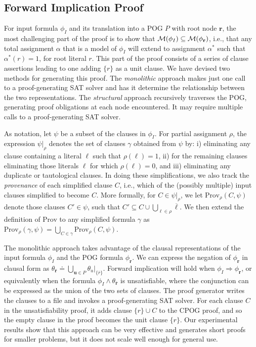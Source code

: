 \documentclass[twoside,11pt]{article}
\newcommand{\obar}[1]{\overline{#1}}
\newcommand{\lit}{\ell}
\newcommand{\imply}{\Rightarrow}
\newcommand{\extend}[1]{#1^{*}}
\newcommand{\assign}{\alpha}
\newcommand{\eassign}{\extend{\alpha}}
\newcommand{\passign}{\rho}
\newcommand{\modelset}{{\cal M}}
\newcommand{\prov}{\textrm{Prov}}
\newcommand{\inputformula}{\phi_I}
\newcommand{\makenode}[1]{\mathbf{#1}}
\newcommand{\nodeu}{\makenode{u}}
\newcommand{\noder}{\makenode{r}}
\newcommand{\simplify}[2]{#1|_{#2}}
\begin{document}
\subsection{Forward Implication Proof}

For input formula $\inputformula$ and its translation into a POG $P$
with root node $\noder$, the most challenging part of the proof is to
show that $\modelset(\inputformula) \subseteq \modelset(\phi_\noder)$, i.e.,
that any total assignment $\assign$ that is a model of $\inputformula$ will extend to assignment $\eassign$
such that $\eassign(r) = 1$, for root literal $r$.  This part of the
proof consists of a series of clause assertions leading to one adding
$\{r\}$ as a unit clause.  We have devised two methods for generating this
proof.  The \emph{monolithic} approach makes just one call to a
proof-generating SAT solver and has it determine the relationship
between the two representations.  The \emph{structural} approach
recursively traverses the POG, generating proof obligations at each
node encountered.  It may require multiple calls to a proof-generating SAT
solver.

As notation,
let $\psi$ be a subset of the clauses in $\inputformula$.
For partial assignment
$\passign$, the expression  $\simplify{\psi}{\passign}$ denotes the set of clauses $\gamma$
obtained from $\psi$ by: i) eliminating any
clause containing a literal $\lit$ such that $\passign(\lit) = 1$,
ii) for the remaining clauses eliminating those literals $\lit$ for
which $\passign(\lit) = 0$, and iii) eliminating any duplicate or tautological clauses.
In doing these simplifications, we also track the \emph{provenance}
of each simplified clause $C$, i.e., which of the (possibly multiple) input clauses simplified to become $C$.
More formally, for $C \in \simplify{\psi}{\passign}$, we let $\prov_{\passign}(C, \psi)$ denote
those clauses $C' \in \psi$, such that
$C' \subseteq C \cup \bigcup_{\lit \in \passign} \obar{\lit}$.
We then extend the definition of $\prov$ to any simplified formula
$\gamma$ as $\prov_{\passign}(\gamma, \psi) = \bigcup_{C \in \gamma} \prov_{\passign}(C, \psi)$.

The monolithic approach
takes advantage of the clausal representations of
the input formula $\inputformula$ and the POG formula $\phi_\noder$.
We can express the negation of $\phi_\noder$ in clausal form as
$\theta_{\obar{\noder}} \doteq \bigcup_{\nodeu\in P} \simplify{\theta_{u}}{\{\obar{r}\}}$.
Forward implication will hold when $\inputformula \imply \phi_\noder$, or  equivalently
when the formula $\inputformula \land \theta_{\obar{\noder}}$
is unsatisfiable, where the
conjunction can be expressed as the union
of the two sets of clauses.  The proof generator writes the clauses to a file and invokes a proof-generating SAT solver.
For each clause $C$ in the unsatisfiability proof, it adds clause $\{r\} \cup C$ to the CPOG proof, and so the empty clause in the proof becomes the unit clause $\{r\}$.
Our experimental results show
that this approach can be very effective and generates short proofs
for smaller problems, but it does not scale well enough for general
use.
\end{document}
